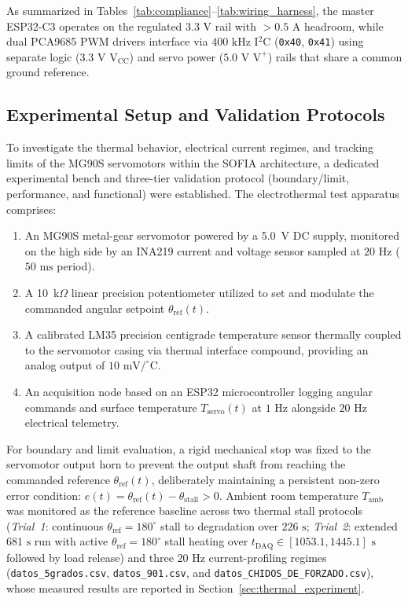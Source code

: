 \documentclass[lettersize,journal]{IEEEtran}
\begin{document}
	As summarized in Tables~\ref{tab:compliance}--\ref{tab:wiring_harness}, the master ESP32-C3 operates on the regulated $3.3\text{ V}$ rail with $> 0.5\text{ A}$ headroom, while dual PCA9685 PWM drivers interface via $400\text{ kHz}$ I$^2$C (\texttt{0x40}, \texttt{0x41}) using separate logic ($3.3\text{ V }\text{V}_{\text{CC}}$) and servo power ($5.0\text{ V }\text{V}^+$) rails that share a common ground reference.
	
	\subsection{Experimental Setup and Validation Protocols}
	\label{sec:thermal_setup}
	
	To investigate the thermal behavior, electrical current regimes, and tracking limits of the MG90S servomotors within the SOFIA architecture, a dedicated experimental bench and three-tier validation protocol (boundary/limit, performance, and functional) were established. The electrothermal test apparatus comprises:
	\begin{enumerate}
		\item {}An MG90S metal-gear servomotor powered by a 5.0~V DC supply, monitored on the high side by an INA219 current and voltage sensor sampled at $20\text{ Hz}$ ($50\text{ ms}$ period).
		\item A 10~k$\Omega$ linear precision potentiometer utilized to set and modulate the commanded angular setpoint $\theta_{\text{ref}}(t)$.
		\item {}A calibrated LM35 precision centigrade temperature sensor thermally coupled to the servomotor casing via thermal interface compound, providing an analog output of $10\text{ mV}/^\circ\text{C}$.
		\item {}An acquisition node based on an ESP32 microcontroller logging angular commands and surface temperature $T_{\text{servo}}(t)$ at $1\text{ Hz}$ alongside $20\text{ Hz}$ electrical telemetry.
	\end{enumerate}
	
	For boundary and limit evaluation, a rigid mechanical stop was fixed to the servomotor output horn to prevent the output shaft from reaching the commanded reference $\theta_{\text{ref}}(t)$, deliberately maintaining a persistent non-zero error condition: $e(t) = \theta_{\text{ref}}(t) - \theta_{\text{stall}} > 0$. Ambient room temperature $T_{\text{amb}}$ was monitored as the reference baseline across two thermal stall protocols (\textit{Trial~1}: continuous $\theta_{\text{ref}} = 180^\circ$ stall to degradation over $226\text{ s}$; \textit{Trial~2}: extended $681\text{ s}$ run with active $\theta_{\text{ref}} = 180^\circ$ stall heating over $t_{\text{DAQ}} \in [1053.1, 1445.1]\text{ s}$ followed by load release) and three $20\text{ Hz}$ current-profiling regimes (\texttt{datos\_5grados.csv}, \texttt{datos\_901.csv}, and \texttt{datos\_CHIDOS\_DE\_FORZADO.csv}), whose measured results are reported in Section~\ref{sec:thermal_experiment}.
	
\end{document}
